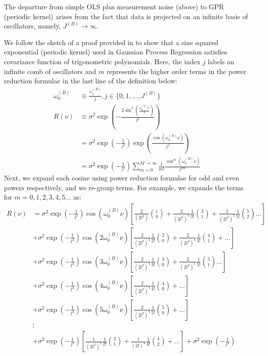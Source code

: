The departure from simple OLS plus measurement noise (above) to GPR (periodic kernel) arises from the fact that data is projected on an infinite basis of oscillators, namely, $J^{(B)} \to \infty$.

We follow the sketch of a proof provided in \cite{solin2014explicit} to show that a sine squared exponential (periodic kernel) used in Gaussian Process Regression satisfies covariance function of trigonometric polynomials. Here, the index $j$ labels an infinite comb of oscillators and $m$ represents the higher order terms in the power reduction formulae in the last line of the definition below:
\begin{align}
\omega_0^{(B)}  &\equiv \frac{\omega_j^{(B)} }{j}, j \in \{0, 1,..., J^{(B)}\} \\
R(\nu) &\equiv \sigma^2 \exp (- \frac{2\sin^2(\frac{\omega_0^{(B)}  \nu}{2})}{l^2}) \\
&=  \sigma^2 \exp (- \frac{1}{l^2}) \exp (\frac{\cos(\omega_0^{(B)}  \nu)}{l^2}) \label{eqn:periodic_0}\\
&=  \sigma^2 \exp (- \frac{1}{l^2}) \sum_{m = 0}^{M  \to\infty} \frac{1}{m!} \frac{\cos^m(\omega_0^{(B)}  \nu)}{l^{2m}} \label{eqn:periodic_1}
\end{align}
Next, we expand each cosine using power reduction formulae for odd and even powers respectively, and we re-group terms. For example, we expande the terms for  $m = 0,1,2,3,4,5...$ as:
\begin{align}
R(\nu) &= \sigma^2 \exp (- \frac{1}{l^2}) \cos(\omega_0^{(B)}  \nu) \left[ \frac{2}{(2l^2)}\binom{1}{0} + \frac{2}{(2l^2)^3} \frac{1}{3!} \binom{3}{1} +  \frac{2}{(2l^2)^5} \frac{1}{5!}\binom{5}{2} \dots \right] \label{eqn:cosine1}\\
& + \sigma^2 \exp (- \frac{1}{l^2}) \cos(2\omega_0^{(B)}  \nu) \left[ \frac{2}{(2l^2)^2} \frac{1}{2!} \binom{2}{0} + \frac{2}{(2l^2)^4} \frac{1}{4!} \binom{4}{1} + \dots \right] \\
& + \sigma^2 \exp (- \frac{1}{l^2}) \cos(3\omega_0^{(B)}  \nu) \left[ \frac{2}{(2l^2)^3} \frac{1}{3!} \binom{3}{0} + \frac{2}{(2l^2)^5} \frac{1}{5!}\binom{5}{1} \dots \right] \\
& + \sigma^2 \exp (- \frac{1}{l^2}) \cos(4\omega_0^{(B)}  \nu) \left[ \frac{2}{(2l^2)^4} \frac{1}{4!} \binom{4}{0} + \dots \right] \\
& + \sigma^2 \exp (- \frac{1}{l^2}) \cos(5\omega_0^{(B)}  \nu) \left[ \frac{2}{(2l^2)^5} \frac{1}{5!}\binom{5}{0} + \dots \right] \label{eqn:cosine5}\\
& \vdots \nonumber \\
& + \sigma^2 \exp (- \frac{1}{l^2}) \left[ \frac{1}{(2l^2)^2} \frac{1}{2!} \binom{2}{1} + \frac{1}{(2l)^4} \frac{1}{4!} \binom{4}{2} + \dots \right] + \sigma^2 \exp (- \frac{1}{l^2}) \label{eqn:eventerms}
\end{align}
